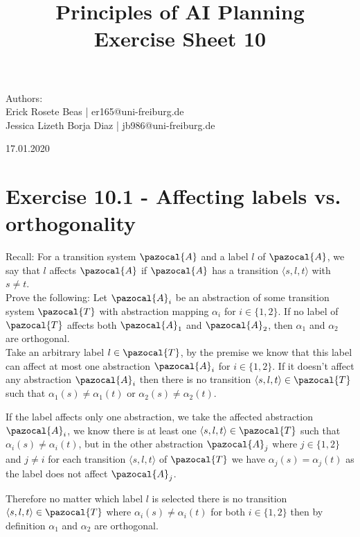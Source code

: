 \documentclass[11pt,a4paper]{article}
\title{\textbf{Principles of AI Planning
		\\{\Large Exercise Sheet 10}}}
\begin{document}
\begin{flushleft}
	Authors:\\
	Erick Rosete Beas | er165@uni-freiburg.de\\
	Jessica Lizeth Borja Diaz | jb986@uni-freiburg.de\\
\end{flushleft}
{\let\newpage\relax\maketitle}
\begin{center} 
	\large 17.01.2020
\end{center}


\section*{Exercise 10.1 - Affecting labels vs. orthogonality}
Recall: For a transition system $\pazocal{A}$ and a label $l$ of $\pazocal{A}$, we say that $l$ affects $\pazocal{A}$ if $\pazocal{A}$ has a transition $\langle s, l, t \rangle$ with $s \neq t$.\\
Prove the following: Let $\pazocal{A}_i$ be an abstraction of some transition system $\pazocal{T}$ with abstraction mapping $\alpha_i$ for $i \in \{1, 2\}$. If no label of $\pazocal{T}$ affects both $\pazocal{A}_1$ and $\pazocal{A}_2$, then $\alpha_1$ and $\alpha_2$ are orthogonal.\\

Take an arbitrary label $l \in \pazocal{T}$, by the premise we know that this label can affect at most one abstraction $\pazocal{A}_i$ for $i \in \{1, 2\}$. If it doesn't affect any abstraction $\pazocal{A}_i$ then there is no transition $\langle s, l ,t \rangle \in \pazocal{T}$ such that 
$\alpha_1(s) \neq \alpha_1(t)$ or $\alpha_2(s) \neq \alpha_2(t)$.

If the label affects only one abstraction, we take the affected abstraction $\pazocal{A}_i$, we know there is at least one $\langle s, l ,t \rangle \in \pazocal{T}$ such that 
$\alpha_i(s) \neq \alpha_i(t)$, but in the other abstraction $\pazocal{A}_j$ where $j \in \{1,2\}$ and $j \neq i$ for each transition $\langle s, l ,t \rangle$ of $\pazocal{T}$ we have
$\alpha_j(s) = \alpha_j(t)$ as the label does not affect $\pazocal{A}_j$.

Therefore no matter which label $l$ is selected there is no transition $\langle s, l, t \rangle \in \pazocal{T}$ where $\alpha_i(s) \neq \alpha_i(t)$ for both $i \in \{1, 2\}$ then by definition $\alpha_1$ and $\alpha_2$ are orthogonal.
	
\end{document}
